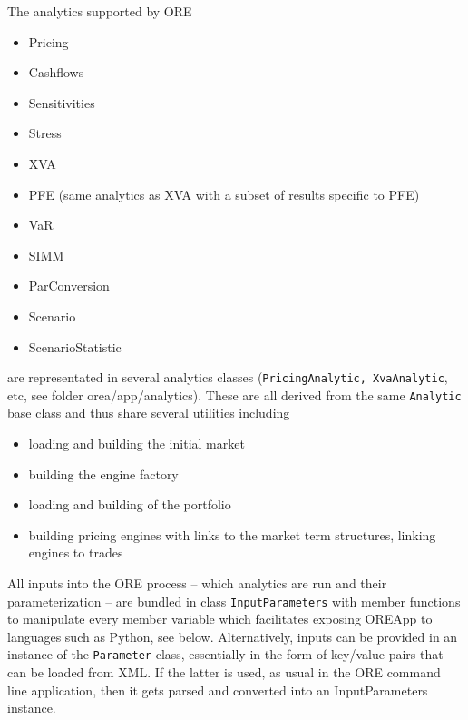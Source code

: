 \documentclass[12pt, a4paper]{report}
\begin{document}
The analytics supported by ORE
\begin{itemize}
\item Pricing
\item Cashflows
\item Sensitivities
\item Stress
\item XVA
\item PFE (same analytics as XVA with a subset of results specific to PFE)
\item VaR
\item SIMM
\item ParConversion
\item Scenario
\item ScenarioStatistic
\end{itemize}
are representated in several analytics classes ({\tt PricingAnalytic, XvaAnalytic}, etc, see folder
orea/app/analytics). These are all derived from the same {\tt Analytic} base class and thus share
several utilities including
\begin{itemize}
\item loading and building the initial market
\item building the engine factory
\item loading and building of the portfolio
\item building pricing engines with links to the market term structures, linking engines to trades
\end{itemize}

All inputs into the ORE process -- which analytics are run and their parameterization -- are bundled
in class {\tt InputParameters} with member functions to manipulate every member variable which
facilitates exposing OREApp to languages such as Python, see below.
Alternatively, inputs can be provided in an instance of the {\tt Parameter} class, essentially
in the form of key/value pairs that can be loaded from XML. If the latter is used, as usual in the ORE
command line application, then it gets parsed and converted into an InputParameters instance.
\end{document}
